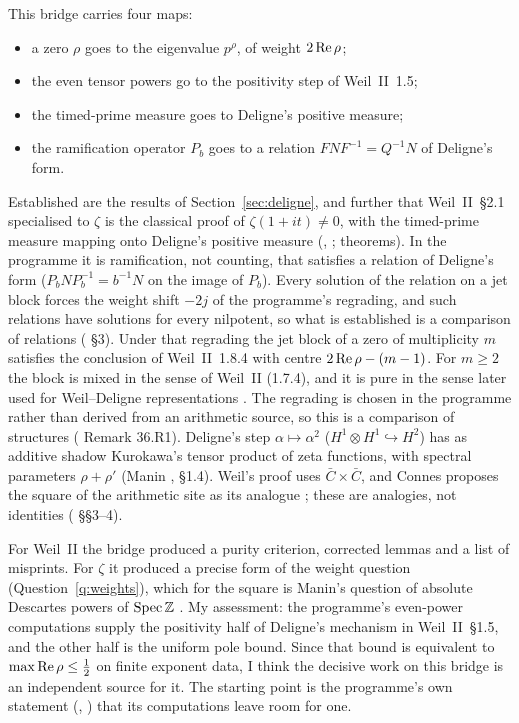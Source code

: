 This bridge carries four maps:
\begin{itemize}
\item a zero $\rho$ goes to the eigenvalue $p^\rho$, of weight $2\operatorname{Re}\rho$;
\item the even tensor powers go to the positivity step of Weil~II~1.5;
\item the timed-prime measure goes to Deligne's positive measure;
\item the ramification operator $P_b$ goes to a relation $FNF^{-1}=Q^{-1}N$ of Deligne's form.
\end{itemize}
Established are the results of Section~\ref{sec:deligne}, and further that Weil~II~§2.1 specialised to $\zeta$ is the classical proof of $\zeta(1+it)\ne0$, with the timed-prime measure mapping onto Deligne's positive measure (, ; theorems).
In the programme it is ramification, not counting, that satisfies a relation of Deligne's form ($P_bNP_b^{-1}=b^{-1}N$ on the image of $P_b$). Every solution of the relation on a jet block forces the weight shift $-2j$ of the programme's regrading, and such relations have solutions for every nilpotent, so what is established is a comparison of relations ( §3).
Under that regrading the jet block of a zero of multiplicity $m$ satisfies the conclusion of Weil~II~1.8.4 with centre $2\operatorname{Re}\rho-(m-1)$. For $m\ge2$ the block is mixed in the sense of Weil~II (1.7.4), and it is pure in the sense later used for Weil--Deligne representations \cite{TaylorYoshida}. The regrading is chosen in the programme rather than derived from an arithmetic source, so this is a comparison of structures ( Remark 36.R1).
Deligne's step $\alpha\mapsto\alpha^2$ ($H^1\otimes H^1\hookrightarrow H^2$) has as additive shadow Kurokawa's tensor product of zeta functions, with spectral parameters $\rho+\rho'$ (Manin \cite{Manin}, §1.4). Weil's proof uses $\bar C\times\bar C$, and Connes proposes the square of the arithmetic site as its analogue \cite{ConnesSquare}; these are analogies, not identities ( §§3--4).

For Weil~II the bridge produced a purity criterion, corrected lemmas and a list of misprints. For $\zeta$ it produced a precise form of the weight question (Question~\ref{q:weights}), which for the square is Manin's question of absolute Descartes powers of $\operatorname{Spec}\mathbb{Z}$ \cite{Manin}.
My assessment: the programme's even-power computations supply the positivity half of Deligne's mechanism in Weil~II~§1.5, and the other half is the uniform pole bound. Since that bound is equivalent to $\max\operatorname{Re}\rho\le\tfrac12$ on finite exponent data, I think the decisive work on this bridge is an independent source for it. The starting point is the programme's own statement (, ) that its computations leave room for one.

